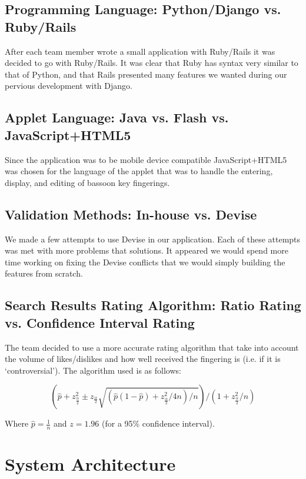 \documentclass[12pt,english]{article}
\begin{document}
\subsection{Programming Language: Python/Django vs. Ruby/Rails}

After each team member wrote a small application with Ruby/Rails
it was decided to go with Ruby/Rails.  It was clear that Ruby has
syntax very similar to that of Python, and that Rails presented 
many features we wanted during our pervious development with
Django.


\subsection{Applet Language: Java vs. Flash vs. JavaScript+HTML5}

Since the application was to be mobile device compatible JavaScript+HTML5
was chosen for the language of the applet that was to handle the entering,
display, and editing of bassoon key fingerings.


\subsection{Validation Methods: In-house vs. Devise}

We made a few attempts to use Devise in our application. Each of these
attempts was met with more problems that solutions.  It appeared we
would spend more time working on fixing the Devise conflicts that we
would simply building the features from scratch.


\subsection{Search Results Rating Algorithm: Ratio Rating vs. Confidence Interval Rating}

The team decided to use a more accurate rating algorithm that take
into account the volume of likes/dislikes and how well received the
fingering is (i.e. if it is `controversial'). The algorithm used is
as follows:

\[
(\hat{p}+z_{\frac{\alpha}{2}}^{2}\pm z_{\frac{\alpha}{2}}\sqrt{(\hat{p}(1-\hat{p})+z_{\frac{\alpha}{2}}^{2}/4n)/n})/(1+z_{\frac{\alpha}{2}}^{2}/n)
\]


Where $\hat{p}=\frac{1}{n}$ and $z=1.96$ (for a 95\% confidence
interval).

\clearpage
\section{System Architecture}
\end{document}
